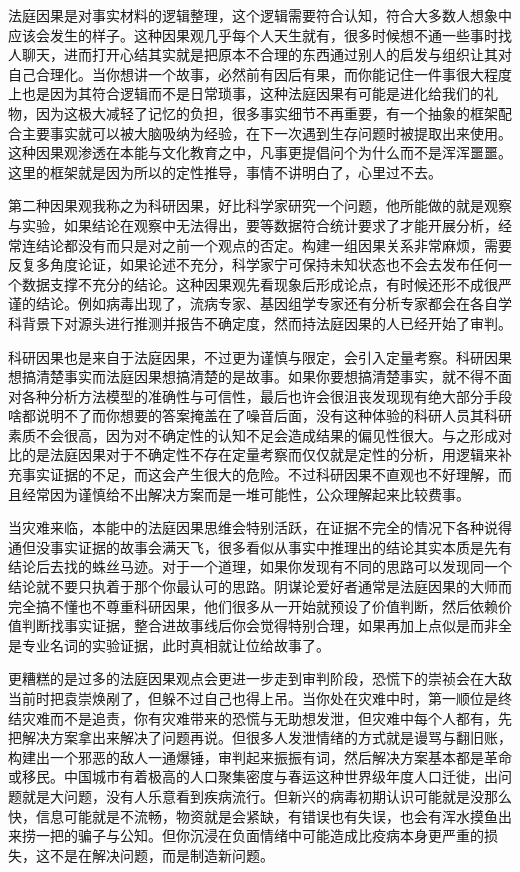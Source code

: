 \documentclass[]{book}
\begin{document}
法庭因果是对事实材料的逻辑整理，这个逻辑需要符合认知，符合大多数人想象中应该会发生的样子。这种因果观几乎每个人天生就有，很多时候想不通一些事时找人聊天，进而打开心结其实就是把原本不合理的东西通过别人的启发与组织让其对自己合理化。当你想讲一个故事，必然前有因后有果，而你能记住一件事很大程度上也是因为其符合逻辑而不是日常琐事，这种法庭因果有可能是进化给我们的礼物，因为这极大减轻了记忆的负担，很多事实细节不再重要，有一个抽象的框架配合主要事实就可以被大脑吸纳为经验，在下一次遇到生存问题时被提取出来使用。这种因果观渗透在本能与文化教育之中，凡事更提倡问个为什么而不是浑浑噩噩。这里的框架就是因为所以的定性推导，事情不讲明白了，心里过不去。

第二种因果观我称之为科研因果，好比科学家研究一个问题，他所能做的就是观察与实验，如果结论在观察中无法得出，要等数据符合统计要求了才能开展分析，经常连结论都没有而只是对之前一个观点的否定。构建一组因果关系非常麻烦，需要反复多角度论证，如果论述不充分，科学家宁可保持未知状态也不会去发布任何一个数据支撑不充分的结论。这种因果观先看现象后形成论点，有时候还形不成很严谨的结论。例如病毒出现了，流病专家、基因组学专家还有分析专家都会在各自学科背景下对源头进行推测并报告不确定度，然而持法庭因果的人已经开始了审判。

科研因果也是来自于法庭因果，不过更为谨慎与限定，会引入定量考察。科研因果想搞清楚事实而法庭因果想搞清楚的是故事。如果你要想搞清楚事实，就不得不面对各种分析方法模型的准确性与可信性，最后也许会很沮丧发现现有绝大部分手段啥都说明不了而你想要的答案掩盖在了噪音后面，没有这种体验的科研人员其科研素质不会很高，因为对不确定性的认知不足会造成结果的偏见性很大。与之形成对比的是法庭因果对于不确定性不存在定量考察而仅仅就是定性的分析，用逻辑来补充事实证据的不足，而这会产生很大的危险。不过科研因果不直观也不好理解，而且经常因为谨慎给不出解决方案而是一堆可能性，公众理解起来比较费事。

当灾难来临，本能中的法庭因果思维会特别活跃，在证据不完全的情况下各种说得通但没事实证据的故事会满天飞，很多看似从事实中推理出的结论其实本质是先有结论后去找的蛛丝马迹。对于一个道理，如果你发现有不同的思路可以发现同一个结论就不要只执着于那个你最认可的思路。阴谋论爱好者通常是法庭因果的大师而完全搞不懂也不尊重科研因果，他们很多从一开始就预设了价值判断，然后依赖价值判断找事实证据，整合进故事线后你会觉得特别合理，如果再加上点似是而非全是专业名词的实验证据，此时真相就让位给故事了。

更糟糕的是过多的法庭因果观点会更进一步走到审判阶段，恐慌下的崇祯会在大敌当前时把袁崇焕剐了，但躲不过自己也得上吊。当你处在灾难中时，第一顺位是终结灾难而不是追责，你有灾难带来的恐慌与无助想发泄，但灾难中每个人都有，先把解决方案拿出来解决了问题再说。但很多人发泄情绪的方式就是谩骂与翻旧账，构建出一个邪恶的敌人一通爆锤，审判起来振振有词，然后解决方案基本都是革命或移民。中国城市有着极高的人口聚集密度与春运这种世界级年度人口迁徙，出问题就是大问题，没有人乐意看到疾病流行。但新兴的病毒初期认识可能就是没那么快，信息可能就是不流畅，物资就是会紧缺，有错误也有失误，也会有浑水摸鱼出来捞一把的骗子与公知。但你沉浸在负面情绪中可能造成比疫病本身更严重的损失，这不是在解决问题，而是制造新问题。
\end{document}
